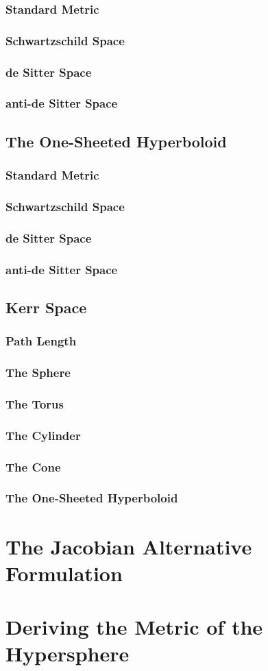\documentclass{article}
\begin{document}
\subsubsection{Standard Metric}
\subsubsection{Schwartzschild Space}
\subsubsection{de Sitter Space}
\subsubsection{anti-de Sitter Space}

\newpage
\subsection{The One-Sheeted Hyperboloid}
\subsubsection{Standard Metric}
\subsubsection{Schwartzschild Space}
\subsubsection{de Sitter Space}
\subsubsection{anti-de Sitter Space}

\newpage
\subsection{Kerr Space}
\subsubsection{Path Length}
\subsubsection{The Sphere}
\subsubsection{The Torus}
\subsubsection{The Cylinder}
\subsubsection{The Cone}
\subsubsection{The One-Sheeted Hyperboloid}

\newpage
\appendix
\section{The Jacobian Alternative Formulation}


\section{Deriving the Metric of the Hypersphere}
\end{document}
